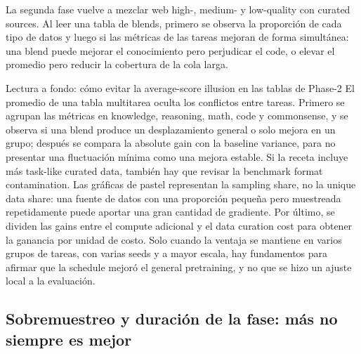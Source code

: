 La segunda fase vuelve a mezclar web high-, medium- y low-quality con curated sources. Al leer una tabla de blends, primero se observa la proporción de cada tipo de datos y luego si las métricas de las tareas mejoran de forma simultánea: una blend puede mejorar el conocimiento pero perjudicar el code, o elevar el promedio pero reducir la cobertura de la cola larga.





\begin{knowledgebox}{Lectura a fondo: cómo evitar la average-score illusion en las tablas de Phase-2}
El promedio de una tabla multitarea oculta los conflictos entre tareas. Primero se agrupan las métricas en knowledge, reasoning, math, code y commonsense, y se observa si una blend produce un desplazamiento general o solo mejora en un grupo; después se compara la absolute gain con la baseline variance, para no presentar una fluctuación mínima como una mejora estable. Si la receta incluye más task-like curated data, también hay que revisar la benchmark format contamination. Las gráficas de pastel representan la sampling share, no la unique data share: una fuente de datos con una proporción pequeña pero muestreada repetidamente puede aportar una gran cantidad de gradiente. Por último, se dividen las gains entre el compute adicional y el data curation cost para obtener la ganancia por unidad de costo. Solo cuando la ventaja se mantiene en varios grupos de tareas, con varias seeds y a mayor escala, hay fundamentos para afirmar que la schedule mejoró el general pretraining, y no que se hizo un ajuste local a la evaluación.
\end{knowledgebox}


\subsection{Sobremuestreo y duración de la fase: más no siempre es mejor}

